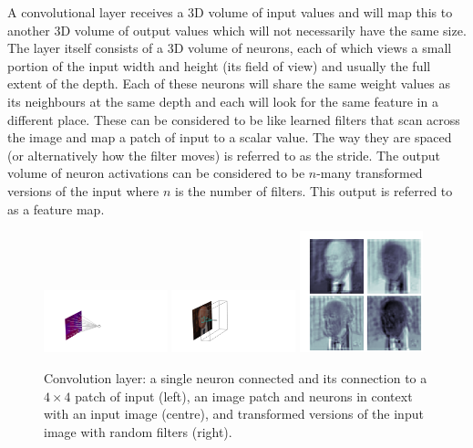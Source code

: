 A convolutional layer receives a 3D volume of input values and will map this to another 3D volume of output values which will not necessarily have the same size. 
The layer itself consists of a 3D volume of neurons, each of which views a small portion of the input width and height (its field of view) and usually the full extent of the depth. 
Each of these neurons will share the same weight values as its neighbours at the same depth and each will look for the same feature in a different place. 
These can be considered to be like learned filters that scan across the image and map a patch of input to a scalar value. The way they are spaced (or alternatively how the filter moves) is referred to as the stride. 
The output volume of neuron activations can be considered to be $n$-many transformed versions of the input where $n$ is the number of filters. This output is referred to as a feature map. 
\begin{figure}[h!]
    \begin{center}
        \includegraphics[width=0.32\textwidth]{figures/machine_learning/convolution_neuron.pdf}
        \includegraphics[width=0.32\textwidth]{figures/machine_learning/convolution_layer.pdf}
        \includegraphics[width=0.32\textwidth]{figures/machine_learning/convolution_transforms.pdf}
    \end{center}
    \caption{Convolution layer: a single neuron connected and its connection to a $4\times{}4$ patch of input (left), an image patch and neurons in context with an input image \cite{Higgs_photo} (centre), and transformed versions of the input image with random filters (right).}
        \label{fig:machine_learning:convolution}
\end{figure}

